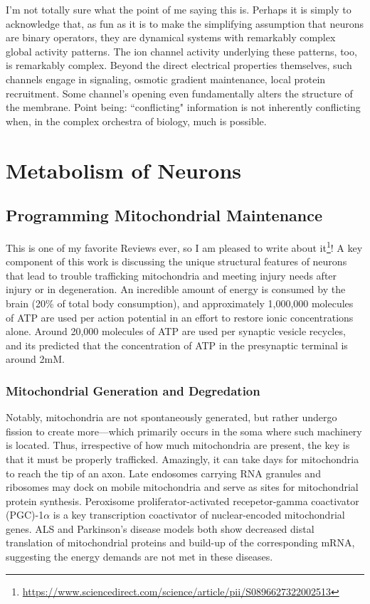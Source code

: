 I'm not totally sure what the point of me saying this is. Perhaps it is simply to acknowledge that, as fun as it is to make the simplifying assumption that neurons are binary operators, they are dynamical systems with remarkably complex global activity patterns. The ion channel activity underlying these patterns, too, is remarkably complex. Beyond the direct electrical properties themselves, such channels engage in signaling, osmotic gradient maintenance, local protein recruitment. Some channel's opening even fundamentally alters the structure of the membrane. Point being: ``conflicting" information is not inherently conflicting when, in the complex orchestra of biology, much is possible. 







\chapter{Metabolism of Neurons}

\section{Programming Mitochondrial Maintenance}

\label{sec:MitochondrialMaintenance}

This is one of my favorite Reviews ever, so I am pleased to write about it\footnote{\url{https://www.sciencedirect.com/science/article/pii/S0896627322002513}}! A key component of this work is discussing the unique structural features of neurons that lead to trouble trafficking mitochondria and meeting injury needs after injury or in degeneration. An incredible amount of energy is consumed by the brain (20\% of total body consumption), and approximately 1,000,000 molecules of ATP are used per action potential in an effort to restore ionic concentrations alone. Around 20,000 molecules of ATP are used per synaptic vesicle recycles, and its predicted that the concentration of ATP in the presynaptic terminal is around 2mM.

\subsection{Mitochondrial Generation and Degredation}

Notably, mitochondria are not spontaneously generated, but rather undergo fission to create more---which primarily occurs in the soma where such machinery is located. Thus, irrespective of how much mitochondria are present, the key is that it must be properly trafficked. Amazingly, it can take days for mitochondria to reach the tip of an axon. Late endosomes carrying RNA granules and ribosomes may dock on mobile mitochondria and serve as sites for mitochondrial protein synthesis. Peroxisome proliferator-activated recepetor-gamma coactivator (PGC)-1$\alpha$ is a key transcription coactivator of nuclear-encoded mitochondrial genes. ALS and Parkinson's disease models both show decreased distal translation of mitochondrial proteins and build-up of the corresponding mRNA, suggesting the energy demands are not met in these diseases.\newline

